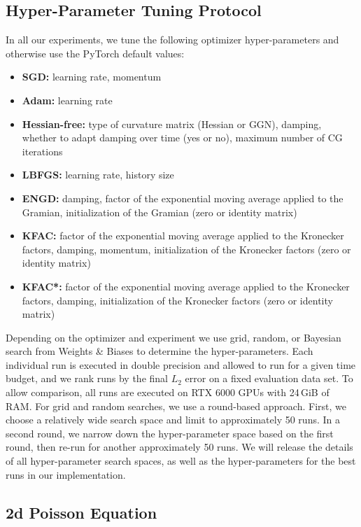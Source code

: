 


\subsection{Hyper-Parameter Tuning Protocol}\label{sec:tuning-protocol}

In all our experiments, we tune the following optimizer hyper-parameters and otherwise use the PyTorch default values:
\begin{itemize}
\item \textbf{SGD:} learning rate, momentum
\item \textbf{Adam:} learning rate
\item \textbf{Hessian-free:} type of curvature matrix (Hessian or GGN), damping, whether to adapt damping over time (yes or no), maximum number of CG iterations
\item \textbf{LBFGS:} learning rate, history size
\item \textbf{ENGD:} damping, factor of the exponential moving average applied to the Gramian, initialization of the Gramian (zero or identity matrix)
\item \textbf{KFAC:} factor of the exponential moving average applied to the Kronecker factors, damping, momentum, initialization of the Kronecker factors (zero or identity matrix)
\item \textbf{KFAC*:} factor of the exponential moving average applied to the Kronecker factors, damping, initialization of the Kronecker factors (zero or identity matrix)
\end{itemize}

Depending on the optimizer and experiment we use grid, random, or Bayesian search from Weights \& Biases to determine the hyper-parameters.
Each individual run is executed in double precision and allowed to run for a given time budget, and we rank runs by the final $L_2$ error on a fixed evaluation data set. To allow comparison, all runs are executed on RTX 6000 GPUs with 24\,GiB of RAM. For grid and random searches, we use a round-based approach.
First, we choose a relatively wide search space and limit to approximately 50 runs.
In a second round, we narrow down the hyper-parameter space based on the first round, then re-run for another approximately 50 runs.
We will release the details of all hyper-parameter search spaces, as well as the hyper-parameters for the best runs in our implementation.

\subsection{2d Poisson Equation}

